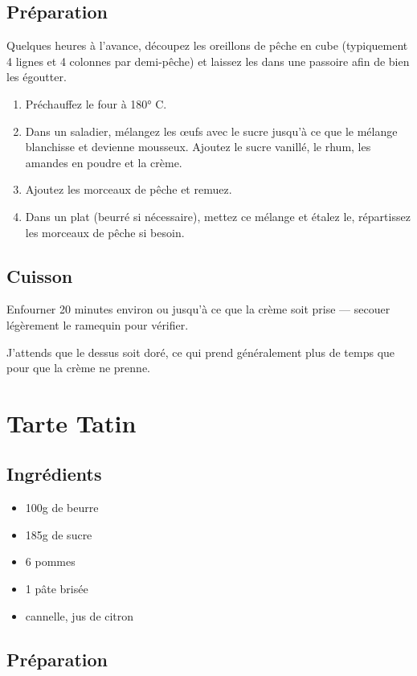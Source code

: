 \subsection*{Préparation}
Quelques heures à l'avance, découpez les oreillons de pêche en cube (typiquement 4 lignes et 4 colonnes par demi-pêche) et laissez les dans une passoire afin de bien les égoutter.

\begin{enumerate}
\item Préchauffez le four à 180° C.
\item Dans un saladier, mélangez les œufs avec le sucre jusqu'à ce que le mélange blanchisse et devienne mousseux. Ajoutez le sucre vanillé, le rhum, les amandes en poudre et la crème. 
\item Ajoutez les morceaux de pêche et remuez.
\item Dans un plat (beurré si nécessaire), mettez ce mélange et étalez le, répartissez les morceaux de pêche si besoin.
\end{enumerate}

\subsection*{Cuisson}
Enfourner 20 minutes environ ou jusqu'à ce que la crème soit prise --- secouer légèrement le ramequin pour vérifier.

\begin{remarque}
J'attends que le dessus soit doré, ce qui prend généralement plus de temps que pour que la crème ne prenne.
\end{remarque}

\newpage
\section{Tarte Tatin}
\subsection*{Ingrédients}
\begin{itemize}
\item 100g de beurre
\item 185g de sucre
\item 6 pommes
\item 1 pâte brisée
\item cannelle, jus de citron
\end{itemize}

\subsection*{Préparation}


